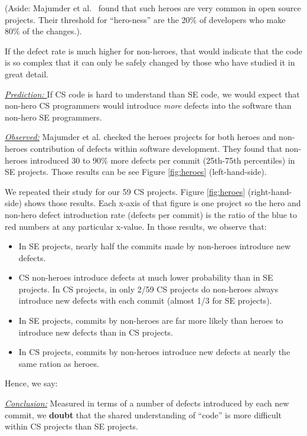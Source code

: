 \documentclass[sigconf,review,anonymous]{acmart}
\newcommand{\bi}{\begin{itemize}}
\newcommand{\ei}{\end{itemize}}
\newenvironment{RQ}{\vspace{1mm}\begin{tcolorbox}[enhanced,width=3.4in,size=fbox,colback=red!5!white,drop shadow southeast,sharp corners]}{\end{tcolorbox}}
\begin{document}
(Aside:   Majumder et al.~\cite{majumder19_heroes} found that such heroes are very common in open source projects. Their threshold for ``hero-ness'' are the 20\% of developers
who make 80\% of the changes.).

If the defect rate is much higher for non-heroes, that would
indicate that the code is so complex that it can only
be safely changed by those who have studied it in great detail.


\noindent \textit{\underline{Prediction: }} If CS code is hard to understand than SE code, we would expect that non-hero CS programmers would
introduce {\em more} defects into the software than non-hero SE programmers. 




\noindent \textit{\underline{Observed:}} Majumder et al. \cite{majumder19_heroes} checked the heroes projects for both heroes and non-heroes contribution of defects within software development. They found that non-heroes introduced 30 to 90\% more defects per commit (25th-75th percentiles) in SE projects. Those
results can be see Figure \ref{fig:heroes} (left-hand-side).

We repeated their study for our 59 CS projects.  Figure \ref{fig:heroes} (right-hand-side)
shows those results. Each x-axis of that figure is one project so the hero and non-hero defect introduction rate (defects per commit) is the ratio of the blue to red numbers
at any particular x-value.
In those results, we observe that:
\bi
\item In SE projects, nearly half the commits made by non-heroes introduce new defects.
\item CS non-heroes introduce defects at much lower probability than in SE projects. In CS projects, in only  2/59 CS projects do non-heroes always introduce new defects with each commit (almost 1/3 for SE projects).
\item In SE projects, commits by non-heroes are far more likely than heroes to introduce new defects than in CS projects.
\item
In CS projects, commits by non-heroes introduce new defects
at nearly the same ration as heroes.
\ei
 
Hence, we say:

\begin{RQ}
\textit{\underline{Conclusion:}} Measured in terms
of a number of defects introduced by each new commit, we \textbf{doubt} that the shared understanding of ``code'' is more difficult within  CS projects than SE projects.
\end{RQ}
\end{document}
